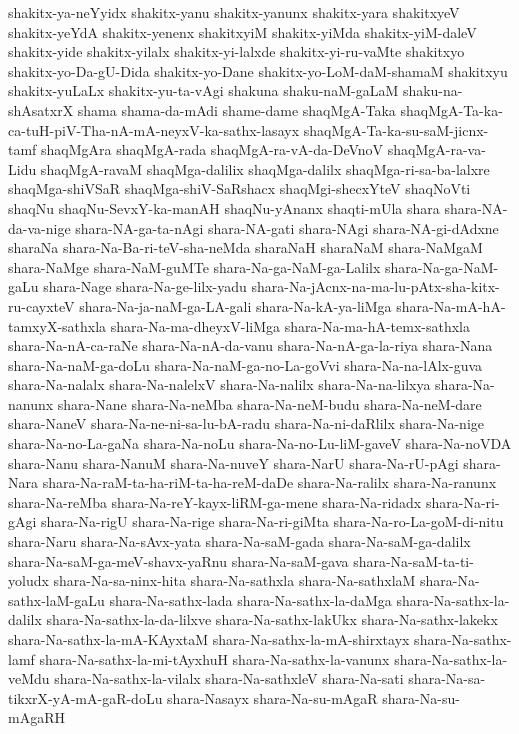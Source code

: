 {shakitx-ya-neYyidx
shakitx-yanu
shakitx-yanunx
shakitx-yara
shakitxyeV
shakitx-yeYdA
shakitx-yenenx
shakitxyiM
shakitx-yiMda
shakitx-yiM-daleV
shakitx-yide
shakitx-yilalx
shakitx-yi-lalxde
shakitx-yi-ru-vaMte
shakitxyo
shakitx-yo-Da-gU-Dida
shakitx-yo-Dane
shakitx-yo-LoM-daM-shamaM
shakitxyu
shakitx-yuLaLx
shakitx-yu-ta-vAgi
shakuna
shaku-naM-gaLaM
shaku-na-shAsatxrX
shama
shama-da-mAdi
shame-dame
shaqMgA-Taka
shaqMgA-Ta-ka-ca-tuH-piV-Tha-nA-mA-neyxV-ka-sathx-lasayx
shaqMgA-Ta-ka-su-saM-jicnx-tamf
shaqMgAra
shaqMgA-rada
shaqMgA-ra-vA-da-DeVnoV
shaqMgA-ra-va-Lidu
shaqMgA-ravaM
shaqMga-dalilix
shaqMga-dalilx
shaqMga-ri-sa-ba-lalxre
shaqMga-shiVSaR
shaqMga-shiV-SaRshacx
shaqMgi-shecxYteV
shaqNoVti
shaqNu
shaqNu-SevxY-ka-manAH
shaqNu-yAnanx
shaqti-mUla
shara
shara-NA-da-va-nige
shara-NA-ga-ta-nAgi
shara-NA-gati
shara-NAgi
shara-NA-gi-dAdxne
sharaNa
shara-Na-Ba-ri-teV-sha-neMda
sharaNaH
sharaNaM
shara-NaMgaM
shara-NaMge
shara-NaM-guMTe
shara-Na-ga-NaM-ga-Lalilx
shara-Na-ga-NaM-gaLu
shara-Nage
shara-Na-ge-lilx-yadu
shara-Na-jAcnx-na-ma-lu-pAtx-sha-kitx-ru-cayxteV
shara-Na-ja-naM-ga-LA-gali
shara-Na-kA-ya-liMga
shara-Na-mA-hA-tamxyX-sathxla
shara-Na-ma-dheyxV-liMga
shara-Na-ma-hA-temx-sathxla
shara-Na-nA-ca-raNe
shara-Na-nA-da-vanu
shara-Na-nA-ga-la-riya
shara-Nana
shara-Na-naM-ga-doLu
shara-Na-naM-ga-no-La-goVvi
shara-Na-na-lAlx-guva
shara-Na-nalalx
shara-Na-nalelxV
shara-Na-nalilx
shara-Na-na-lilxya
shara-Na-nanunx
shara-Nane
shara-Na-neMba
shara-Na-neM-budu
shara-Na-neM-dare
shara-NaneV
shara-Na-ne-ni-sa-lu-bA-radu
shara-Na-ni-daRlilx
shara-Na-nige
shara-Na-no-La-gaNa
shara-Na-noLu
shara-Na-no-Lu-liM-gaveV
shara-Na-noVDA
shara-Nanu
shara-NanuM
shara-Na-nuveY
shara-NarU
shara-Na-rU-pAgi
shara-Nara
shara-Na-raM-ta-ha-riM-ta-ha-reM-daDe
shara-Na-ralilx
shara-Na-ranunx
shara-Na-reMba
shara-Na-reY-kayx-liRM-ga-mene
shara-Na-ridadx
shara-Na-ri-gAgi
shara-Na-rigU
shara-Na-rige
shara-Na-ri-giMta
shara-Na-ro-La-goM-di-nitu
shara-Naru
shara-Na-sAvx-yata
shara-Na-saM-gada
shara-Na-saM-ga-dalilx
shara-Na-saM-ga-meV-shavx-yaRnu
shara-Na-saM-gava
shara-Na-saM-ta-ti-yoludx
shara-Na-sa-ninx-hita
shara-Na-sathxla
shara-Na-sathxlaM
shara-Na-sathx-laM-gaLu
shara-Na-sathx-lada
shara-Na-sathx-la-daMga
shara-Na-sathx-la-dalilx
shara-Na-sathx-la-da-lilxve
shara-Na-sathx-lakUkx
shara-Na-sathx-lakekx
shara-Na-sathx-la-mA-KAyxtaM
shara-Na-sathx-la-mA-shirxtayx
shara-Na-sathx-lamf
shara-Na-sathx-la-mi-tAyxhuH
shara-Na-sathx-la-vanunx
shara-Na-sathx-la-veMdu
shara-Na-sathx-la-vilalx
shara-Na-sathxleV
shara-Na-sati
shara-Na-sa-tikxrX-yA-mA-gaR-doLu
shara-Nasayx
shara-Na-su-mAgaR
shara-Na-su-mAgaRH
}
